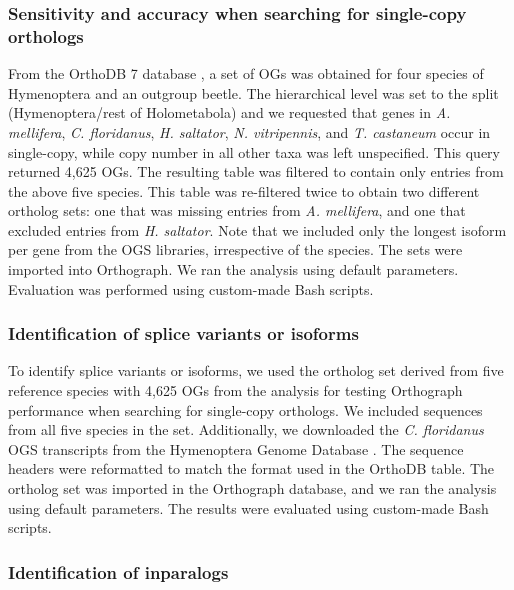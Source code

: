 \subsubsection{Sensitivity and accuracy when searching for single-copy
orthologs}

From the OrthoDB 7 database \citep{Waterhouse2013}, a set of OGs was
obtained for four species of Hymenoptera and an outgroup beetle. The
hierarchical level was set to the split (Hymenoptera/rest of
Holometabola) and we requested that genes in \emph{A. mellifera},
\emph{C. floridanus}, \emph{H. saltator}, \emph{N. vitripennis}, and
\emph{T. castaneum} occur in single-copy, while copy number in all other
taxa was left unspecified. This query returned 4,625 OGs. The resulting
table was filtered to contain only entries from the above five species.
This table was re-filtered twice to obtain two different ortholog sets:
one that was missing entries from \emph{A. mellifera}, and one that
excluded entries from \emph{H. saltator}. Note that we included only the
longest isoform per gene from the OGS libraries, irrespective of the
species. The sets were imported into Orthograph. We ran the analysis
using default parameters. Evaluation was performed using custom-made
Bash scripts.

\subsubsection{Identification of splice variants or
isoforms}

To identify splice variants or isoforms, we used the ortholog set
derived from five reference species with 4,625 OGs from the analysis for
testing Orthograph performance when searching for single-copy orthologs.
We included sequences from all five species in the set. Additionally, we
downloaded the \emph{C. floridanus} OGS transcripts from the Hymenoptera
Genome Database \citep{Munoz-Torres2011}. The sequence headers were
reformatted to match the format used in the OrthoDB table. The ortholog
set was imported in the Orthograph database, and we ran the analysis
using default parameters. The results were evaluated using custom-made
Bash scripts.

\subsubsection{Identification of
inparalogs}

